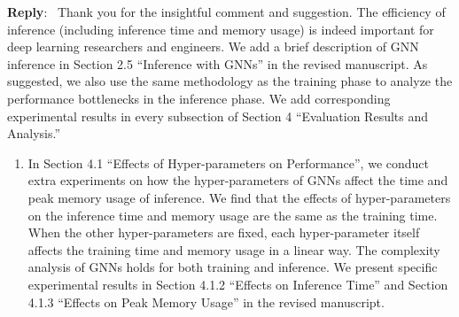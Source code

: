 \documentclass[12pt]{article}
\newenvironment{reply}
   {\medskip \noindent \textbf{Reply}:\  }
   {\medskip}
\begin{document}
\begin{reply}
    Thank you for the insightful comment and suggestion.
    The efficiency of inference (including inference time and memory usage) is indeed important for deep learning researchers and engineers.
    We add a brief description of GNN inference in Section 2.5 ``Inference with GNNs'' in the revised manuscript.
    As suggested, we also use the same methodology as the training phase to analyze the performance bottlenecks in the inference phase.
    We add corresponding experimental results in every subsection of Section 4 ``Evaluation Results and Analysis.''
    \begin{enumerate}
    
    \item In Section 4.1 ``Effects of Hyper-parameters on Performance'', we conduct extra experiments on how the hyper-parameters of GNNs affect the time and peak memory usage of inference.
    We find that the effects of hyper-parameters on the inference time and memory usage are the same as the training time.
    When the other hyper-parameters are fixed, each hyper-parameter itself affects the training time and memory usage in a linear way.
    The complexity analysis of GNNs holds for both training and inference.
    We present specific experimental results in Section 4.1.2 ``Effects on Inference Time'' and Section 4.1.3 ``Effects on Peak Memory Usage'' in the revised manuscript.
    

\end{enumerate}
\end{reply}
\end{document}
